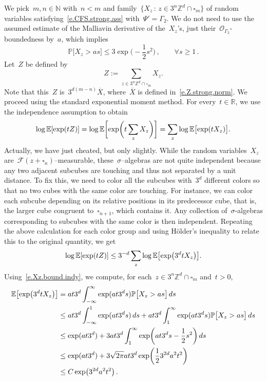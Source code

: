 \documentclass[11pt,twoside]{article} %
\let\oldsquare\square %
\renewcommand{\square}{\oldsquare}
\numberwithin{equation}{section}
\theoremstyle{definition}
\let\originalleft\left
\let\originalright\right
\renewcommand{\left}{\mathopen{}\mathclose\bgroup\originalleft}
\renewcommand{\right}{\aftergroup\egroup\originalright}
\newcommand*{\N}{\ensuremath{\mathbb{N}}}
\newcommand*{\R}{\ensuremath{\mathbb{R}}}
\newcommand*{\Zd}{\ensuremath{\mathbb{Z}^d}}
\newcommand{\cu}{\square}
\newcommand{\F}{\mathcal{F}}
\renewcommand{\P}{\mathbb{P}}
\newcommand{\E}{\mathbb{E}}
\renewcommand{\O}{\mathcal{O}}
\begin{document}
We pick~$m,n\in\N$ with~$n<m$ and family~$\{ X_z \,:\, z\in 3^n\Zd\cap \cu_m\}$ of random variables satisfying~\eqref{e.CFS.strong.ass} with~$\Psi'=\Gamma_2$. We do not need to use the assumed estimate of the Malliavin derivative of the~$X_z$'s, just their~$\O_{\Gamma_2}$-boundedness by~$a$, which implies
\begin{equation}
\label{e.Xz.bound.indy}
\P \bigl[ X_z > as \bigr] \leq 3 \exp\biggl( - \frac12 s^2 \biggr)\,, \qquad \forall s\geq 1\,.
\end{equation}
Let~$Z$ be defined by 
\begin{equation}
\label{e.Z}
Z:= \sum_{z\in 3^n\Zd \cap\cu_m} 
X_z. 
\end{equation}
Note that this~$Z$ is~$3^{d(m-n)} \overline{X}$, where~$\overline{X}$ is defined in~\eqref{e.Z.strong.norm}. 
We proceed using the standard exponential moment method. 
For every~$t\in\R$, we use the independence assumption to obtain
\begin{equation*}
\log \E \left[ \exp\left( t Z\right) \right]
= 
\log \E \biggl[ \exp\biggl( t\sum_{z} X_z \biggr) \biggr]
= 
\sum_{z} \log \E \bigl[ \exp ( t X_z ) \bigr].
\end{equation*}
Actually, we have just cheated, but only slightly. While the random variables~$X_z$ are~$\F(z+\cu_n)$--measurable, these~$\sigma$--algebras are not quite independent because any two adjacent subcubes are touching and thus not separated by a unit distance. To fix this, we need to color all the subcubes with~$3^d$ different colors so that no two cubes with the same color are touching. For instance, we can color each subcube depending on its relative positions in its predecessor cube, that is, the larger cube congruent to~$\cu_{n+1}$, which contains it.  Any collection of~$\sigma$-algebras corresponding to subcubes with the same color is then independent. Repeating the above calculation for each color group and using H\"older's inequality to relate this to the original quantity, we get
\begin{equation}
\label{e.indy.expmom}
\log \E \left[ \exp\left( t  Z\right) \right]
\leq 
3^{-d} \sum_{z} \log \E \left[ \exp \left( 3^dt  X_z  \right) \right].
\end{equation}
Using~\eqref{e.Xz.bound.indy}, we compute, for each~$z\in 3^n\Zd\cap \cu_m$ and~$t>0$, 
\begin{align*}
\E \left[ \exp \left( 3^dt  X_z  \right) \right]
& 
=
at3^d 
\int_{-\infty}^\infty 
\exp(at 3^d s) \P \bigl[ X_z > a s \bigr] \,ds
\\ & 
\leq
at3^d 
\int_{-\infty}^1 
\exp(at 3^d s) \,ds
+
at3^d 
\int_{1}^\infty 
\exp(at 3^d s) \P \bigl[ X_z > a s \bigr] \,ds
\\
&
\leq 
\exp( at3^d) 
+
3at3^d 
\int_{1}^\infty 
\exp\biggl(at 3^d s -\frac12s^2 \biggr) \,ds
\\ & 
\leq
\exp( at3^d) 
+
3\sqrt{2\pi} 
at3^d \exp\biggl( \frac123^{2d} a^2 t^2 \biggr)
\\ & 
\leq 
C \exp\bigl( 3^{2d} a^2 t^2 \bigr)
\,.
\end{align*}
\end{document}
